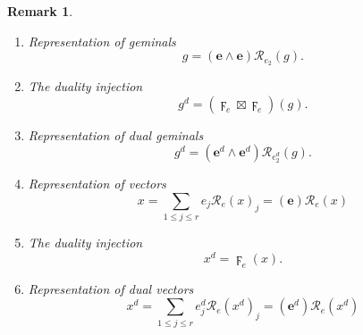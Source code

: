 \documentclass[aps,preprint]{revtex4}%
\newtheorem{remark}[theorem]{Remark}
\begin{document}
\begin{remark}
\begin{enumerate}
\item Representation of geminals%
\begin{equation}
g=\left(  \mathbf{e}\wedge\mathbf{e}\right)  \mathcal{R}_{e_{2}}\left(
g\right)  .
\end{equation}


\item The duality injection
\begin{equation}
g^{d}=\left(  \digamma_{e}\boxtimes\digamma_{e}\right)  \left(  g\right)  .
\end{equation}


\item Representation of dual geminals
\begin{equation}
g^{d}=\left(  \mathbf{e}^{d}\wedge\mathbf{e}^{d}\right)  \mathcal{R}%
_{e_{2}^{d}}\left(  g\right)  .
\end{equation}


\item Representation of vectors
\begin{equation}
x=\sum_{1\leq j\leq r}e_{j}\mathcal{R}_{e}\left(  x\right)  _{j}=\left(
\mathbf{e}\right)  \mathcal{R}_{e}\left(  x\right)
\end{equation}


\item The duality injection
\begin{equation}
x^{d}=\digamma_{e}\left(  x\right)  .
\end{equation}


\item Representation of dual vectors
\begin{equation}
x^{d}=\sum_{1\leq j\leq r}e_{j}^{d}\mathcal{R}_{e}\left(  x^{d}\right)
_{j}=\left(  \mathbf{e}^{d}\right)  \mathcal{R}_{e}\left(  x^{d}\right)
\end{equation}

\end{enumerate}
\end{remark}
\end{document}
